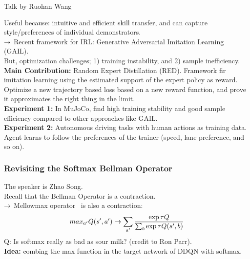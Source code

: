 Talk by Ruohan Wang \\


Useful because: intuitive and efficient skill transfer, and can capture style/preferences of individual demonstrators. \\

$\rightarrow$ Recent framework for IRL: Generative Adversarial Imitation Learning (GAIL). \\

But, optimization challenges; 1) training instability, and 2) sample inefficiency. \\

{\bf Main Contribution:} Random Expert Distillation (RED). Framework fir imitation learning using the estimated support of the expert policy as reward. \\

Optimize a new trajectory based loss based on a new reward function, and prove it approximates the right thing in the limit. \\

{\bf Experiment 1:} In MuJoCo, find high training stability and good sample efficiency compared to other approaches like GAIL. \\

{\bf Experiment 2:} Autonomous driving tasks with human actions as training data. Agent learns to follow the preferences of the trainer (speed, lane preference, and so on).

\spacerule

\subsubsection{Revisiting the Softmax Bellman Operator}

The speaker is Zhao Song. \\

Recall that the Bellman Operator is a contraction. \\

$\rightarrow$ Mellowmax operator~\cite{asadi} is also a contraction:
\[
max_{a'} Q(s',a') \rightarrow \sum_{a'} \frac{\exp \tau Q}{\sum_b \exp \tau Q(s',b)}
\]
Q: Is softmax really as bad as sour milk? (credit to Ron Parr). \\

{\bf Idea:} combing the max function in the target network of DDQN with softmax. \\

